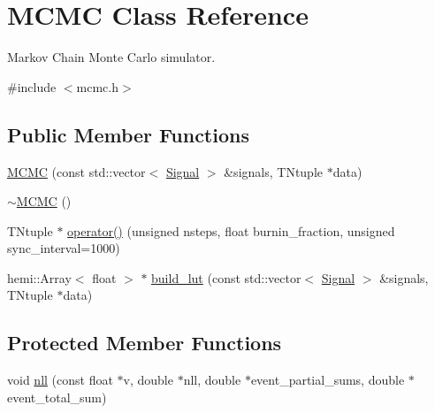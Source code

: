 \hypertarget{classMCMC}{
\section{MCMC Class Reference}
\label{classMCMC}
}


Markov Chain Monte Carlo simulator.  




{\ttfamily \#include $<$mcmc.h$>$}

\subsection*{Public Member Functions}
\begin{DoxyCompactItemize}
\item 
\hyperlink{classMCMC_a6b770d2197d45c0fcc136294fbeec672}{MCMC} (const std::vector$<$ \hyperlink{structSignal}{Signal} $>$ \&signals, TNtuple $\ast$data)
\item 
\hyperlink{classMCMC_a2d7d02c0892819ff5c9f91bc377d1def}{$\sim$MCMC} ()
\item 
TNtuple $\ast$ \hyperlink{classMCMC_ac76eeacb8a362af4c62c596380b8da64}{operator()} (unsigned nsteps, float burnin\_\-fraction, unsigned sync\_\-interval=1000)
\item 
hemi::Array$<$ float $>$ $\ast$ \hyperlink{classMCMC_ab6a9587552fd9b23c2d13d97b791f05a}{build\_\-lut} (const std::vector$<$ \hyperlink{structSignal}{Signal} $>$ \&signals, TNtuple $\ast$data)
\end{DoxyCompactItemize}
\subsection*{Protected Member Functions}
\begin{DoxyCompactItemize}
\item 
void \hyperlink{classMCMC_a1ed0f9d2fdc8aafec039dfa023289490}{nll} (const float $\ast$v, double $\ast$nll, double $\ast$event\_\-partial\_\-sums, double $\ast$event\_\-total\_\-sum)
\end{DoxyCompactItemize}
